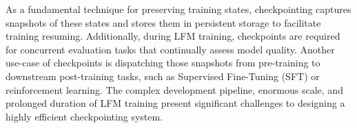 As a fundamental technique for preserving training states,
checkpointing captures snapshots of these states and stores them in persistent storage to facilitate training resuming.
Additionally, during LFM training, checkpoints are required for concurrent evaluation tasks that continually assess model quality.
Another use-case of checkpoints is dispatching those snapshots from pre-training to downstream post-training tasks, such as Supervised Fine-Tuning (SFT) or reinforcement learning.
The complex development pipeline, enormous scale, and prolonged duration of LFM training present significant challenges to designing a highly efficient checkpointing system.


